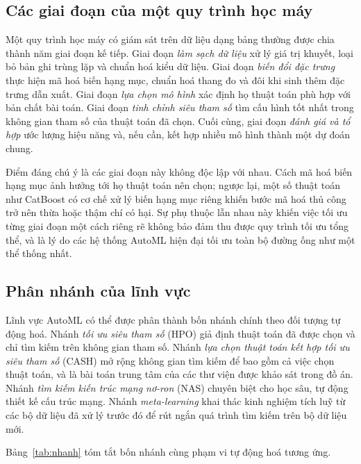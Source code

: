 \subsection{Các giai đoạn của một quy trình học máy}
Một quy trình học máy có giám sát trên dữ liệu dạng bảng thường được chia thành
năm giai đoạn kế tiếp. Giai đoạn \emph{làm sạch dữ liệu} xử lý giá trị khuyết,
loại bỏ bản ghi trùng lặp và chuẩn hoá kiểu dữ liệu. Giai đoạn \emph{biến đổi đặc
trưng} thực hiện mã hoá biến hạng mục, chuẩn hoá thang đo và đôi khi sinh thêm đặc
trưng dẫn xuất. Giai đoạn \emph{lựa chọn mô hình} xác định họ thuật toán phù hợp
với bản chất bài toán. Giai đoạn \emph{tinh chỉnh siêu tham số} tìm cấu hình tốt
nhất trong không gian tham số của thuật toán đã chọn. Cuối cùng, giai đoạn
\emph{đánh giá và tổ hợp} ước lượng hiệu năng và, nếu cần, kết hợp nhiều mô hình
thành một dự đoán chung.

Điểm đáng chú ý là các giai đoạn này không độc lập với nhau. Cách mã hoá biến hạng
mục ảnh hưởng tới họ thuật toán nên chọn; ngược lại, một số thuật toán như
CatBoost có cơ chế xử lý biến hạng mục riêng khiến bước mã hoá thủ công trở nên
thừa hoặc thậm chí có hại. Sự phụ thuộc lẫn nhau này khiến việc tối ưu từng giai
đoạn một cách riêng rẽ không bảo đảm thu được quy trình tối ưu tổng thể, và là lý
do các hệ thống AutoML hiện đại tối ưu toàn bộ đường ống như một thể thống nhất.

\subsection{Phân nhánh của lĩnh vực}
Lĩnh vực AutoML có thể được phân thành bốn nhánh chính theo đối tượng tự động
hoá. Nhánh \emph{tối ưu siêu tham số} (HPO) giả định thuật toán đã được chọn và
chỉ tìm kiếm trên không gian tham số. Nhánh \emph{lựa chọn thuật toán kết hợp tối
ưu siêu tham số} (CASH) mở rộng không gian tìm kiếm để bao gồm cả việc chọn thuật
toán, và là bài toán trung tâm của các thư viện được khảo sát trong đồ án. Nhánh
\emph{tìm kiếm kiến trúc mạng nơ-ron} (NAS) chuyên biệt cho học sâu, tự động thiết
kế cấu trúc mạng. Nhánh \emph{meta-learning} khai thác kinh nghiệm tích luỹ từ các
bộ dữ liệu đã xử lý trước đó để rút ngắn quá trình tìm kiếm trên bộ dữ liệu mới.

Bảng~\ref{tab:nhanh} tóm tắt bốn nhánh cùng phạm vi tự động hoá tương ứng.

